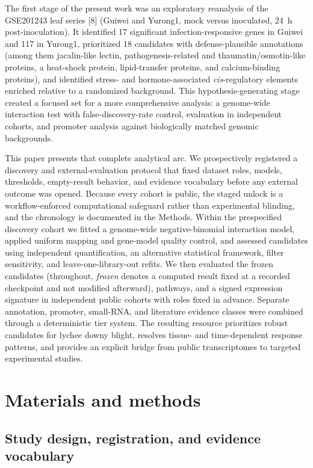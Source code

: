 \documentclass[referee,pdflatex,sn-basic,Numbered]{sn-jnl}
\begin{document}
The first stage of the present work was an exploratory reanalysis of the GSE201243 leaf series [8] (Guiwei and Yurong1, mock versus inoculated, 24~h post-inoculation). It identified 17 significant infection-responsive genes in Guiwei and 117 in Yurong1, prioritized 18 candidates with defense-plausible annotations (among them jacalin-like lectin, pathogenesis-related and thaumatin/osmotin-like proteins, a heat-shock protein, lipid-transfer proteins, and calcium-binding proteins), and identified stress- and hormone-associated \textit{cis}-regulatory elements enriched relative to a randomized background. This hypothesis-generating stage created a focused set for a more comprehensive analysis: a genome-wide interaction test with false-discovery-rate control, evaluation in independent cohorts, and promoter analysis against biologically matched genomic backgrounds.

This paper presents that complete analytical arc. We prospectively registered a discovery and external-evaluation protocol that fixed dataset roles, models, thresholds, empty-result behavior, and evidence vocabulary before any external outcome was opened. Because every cohort is public, the staged unlock is a workflow-enforced computational safeguard rather than experimental blinding, and the chronology is documented in the Methods. Within the prespecified discovery cohort we fitted a genome-wide negative-binomial interaction model, applied uniform mapping and gene-model quality control, and assessed candidates using independent quantification, an alternative statistical framework, filter sensitivity, and leave-one-library-out refits. We then evaluated the frozen candidates (throughout, \emph{frozen} denotes a computed result fixed at a recorded checkpoint and not modified afterward), pathways, and a signed expression signature in independent public cohorts with roles fixed in advance. Separate annotation, promoter, small-RNA, and literature evidence classes were combined through a deterministic tier system. The resulting resource prioritizes robust candidates for lychee downy blight, resolves tissue- and time-dependent response patterns, and provides an explicit bridge from public transcriptomes to targeted experimental studies.

\section{Materials and methods}\label{sec:methods}

\subsection{Study design, registration, and evidence vocabulary}
\end{document}

